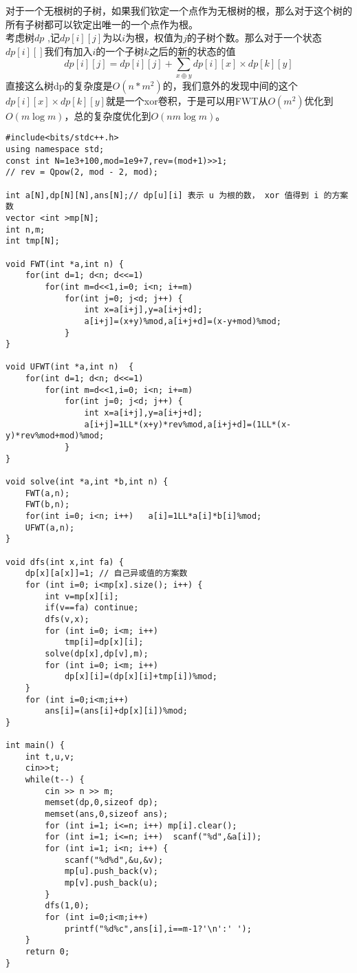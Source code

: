 对于一个无根树的子树，如果我们钦定一个点作为无根树的根，那么对于这个树的所有子树都可以钦定出唯一的一个点作为根。 \\
考虑树$dp$ ,记$dp[i][j]$为以$i$为根，权值为$j$的子树个数。那么对于一个状态$dp[i][]$我们有加入$i$的一个子树$k$之后的新的状态的值
$$
dp[i][j]=dp[i][j]+\sum_{x\oplus y}dp[i][x]\times dp[k][y]
$$
直接这么树dp的复杂度是$O(n*m^2)$的，我们意外的发现中间的这个$dp[i][x]\times dp[k][y]$就是一个xor卷积，于是可以用FWT从$O(m^2)$优化到 $O(m\log m)$，总的复杂度优化到$O(nm\log m)$。
\begin{lstlisting}
#include<bits/stdc++.h>
using namespace std;
const int N=1e3+100,mod=1e9+7,rev=(mod+1)>>1;
// rev = Qpow(2, mod - 2, mod);

int a[N],dp[N][N],ans[N];// dp[u][i] 表示 u 为根的数， xor 值得到 i 的方案数
vector <int >mp[N];
int n,m;
int tmp[N];

void FWT(int *a,int n) {
    for(int d=1; d<n; d<<=1)
        for(int m=d<<1,i=0; i<n; i+=m)
            for(int j=0; j<d; j++) {
                int x=a[i+j],y=a[i+j+d];
                a[i+j]=(x+y)%mod,a[i+j+d]=(x-y+mod)%mod;
            }
}

void UFWT(int *a,int n)  {
    for(int d=1; d<n; d<<=1)
        for(int m=d<<1,i=0; i<n; i+=m)
            for(int j=0; j<d; j++) {
                int x=a[i+j],y=a[i+j+d];
                a[i+j]=1LL*(x+y)*rev%mod,a[i+j+d]=(1LL*(x-y)*rev%mod+mod)%mod;
            }
}

void solve(int *a,int *b,int n) {
    FWT(a,n);
    FWT(b,n);
    for(int i=0; i<n; i++)   a[i]=1LL*a[i]*b[i]%mod;
    UFWT(a,n);
}

void dfs(int x,int fa) {
    dp[x][a[x]]=1; // 自己异或值的方案数
    for (int i=0; i<mp[x].size(); i++) {
        int v=mp[x][i];
        if(v==fa) continue;
        dfs(v,x);
        for (int i=0; i<m; i++)
            tmp[i]=dp[x][i];
        solve(dp[x],dp[v],m);
        for (int i=0; i<m; i++)
            dp[x][i]=(dp[x][i]+tmp[i])%mod;
    }
    for (int i=0;i<m;i++)
        ans[i]=(ans[i]+dp[x][i])%mod;
}

int main() {
    int t,u,v;
    cin>>t;
    while(t--) {
        cin >> n >> m;
        memset(dp,0,sizeof dp);
        memset(ans,0,sizeof ans);
        for (int i=1; i<=n; i++) mp[i].clear();
        for (int i=1; i<=n; i++)  scanf("%d",&a[i]);
        for (int i=1; i<n; i++) {
            scanf("%d%d",&u,&v);
            mp[u].push_back(v);
            mp[v].push_back(u);
        }
        dfs(1,0);
        for (int i=0;i<m;i++)
            printf("%d%c",ans[i],i==m-1?'\n':' ');
    }
    return 0;
}
\end{lstlisting}

%
